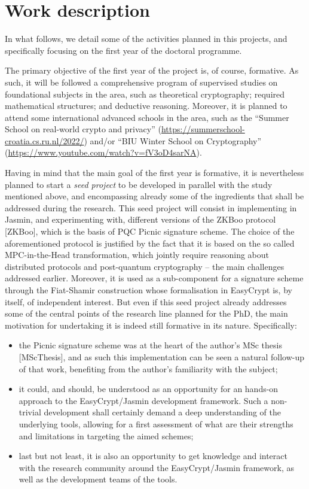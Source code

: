 \documentclass[preprint]{iacrtrans}
\begin{document}
\section*{Work description}

In what follows, we detail some of the activities planned in this
projects, and specifically focusing on the first year of the
doctoral programme.

The primary objective of the first year of the project is, of course,
formative. As such, it will be followed a comprehensive program of
supervised studies on foundational subjects in the area, such as
theoretical cryptography; required mathematical structures; and
deductive reasoning. Moreover, it is planned to attend some
international advanced schools in the area, such as the ``Summer
School on real-world crypto and privacy''
(\url{https://summerschool-croatia.cs.ru.nl/2022/}) and/or ``BIU
Winter School on Cryptography''
(\url{https://www.youtube.com/watch?v=fV3oD4sarNA}).

Having in mind that the main goal of the first year is formative, it
is nevertheless planned to start a \emph{seed project} to be developed
in parallel with the study mentioned above, and encompassing already some
of the ingredients that shall be addressed during the
research. This seed project will consist in implementing in Jasmin, and
experimenting with, different versions of the ZKBoo protocol [ZKBoo],
which is the basis of PQC Picnic signature scheme. The choice of the
aforementioned protocol is justified by the fact that it is based on
the so called MPC-in-the-Head transformation, which jointly require
reasoning about distributed protocols and post-quantum cryptography --
the main challenges addressed earlier. Moreover, it is used as a
sub-component for a signature scheme through the Fiat-Shamir
construction whose formalisation in EasyCrypt is, by itself, of
independent interest.  But even if this seed project already addresses
some of the central points of the research line planned for the PhD,
the main motivation for undertaking it is indeed still formative in
its nature. Specifically:
\begin{itemize}
\item the Picnic signature scheme was at the heart of the author's MSc
  thesis [MScThesis], and as such this implementation can be seen a
  natural follow-up of that work, benefiting from the author's
  familiarity with the subject;
\item it could, and should, be understood as an opportunity for an
  hands-on approach to the EasyCrypt/Jasmin development
  framework. Such a non-trivial development shall certainly demand a
  deep understanding of the underlying tools, allowing for a first
  assessment of what are their strengths and limitations in targeting
  the aimed schemes;
\item last but not least, it is also an opportunity to get knowledge
  and interact with the research community around the EasyCrypt/Jasmin
  framework, as well as the development teams of the tools.
\end{itemize}




\printbibliography{}
\end{document}
